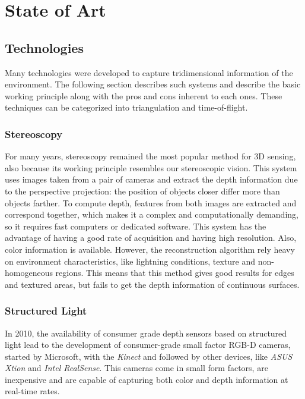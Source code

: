 \chapter{State of Art}

\section{Technologies}

Many technologies were developed to capture tridimensional information of the environment. The following section describes such systems and describe the basic working principle along with the pros and cons inherent to each ones. These techniques can be categorized into triangulation and time-of-flight.

\subsection{Stereoscopy}

For many years, stereoscopy remained the most popular method for 3D sensing, also because its working principle resembles our stereoscopic vision. This system uses images taken from a pair of cameras and extract the depth information due to the perspective projection: the position of objects closer differ more than objects farther. To compute depth, features from both images are extracted and correspond together, which makes it a complex and computationally demanding, so it requires fast computers or dedicated software. This system has the advantage of having a good rate of acquisition and having high resolution. Also, color information is available. However, the reconstruction algorithm rely heavy on environment characteristics, like lightning conditions, texture and non-homogeneous regions\cite{klimentjew2010}. This means that this method gives good results for edges and textured areas, but fails to get the depth information of continuous surfaces.

\subsection{Structured Light}

In 2010, the availability of consumer grade depth sensors based on structured light lead to the development of consumer-grade small factor RGB-D cameras, started by Microsoft, with the \textit{Kinect} and followed by other devices, like \textit{ASUS Xtion} and \textit{Intel RealSense}. This cameras come in small form factors, are inexpensive and are capable of capturing both color and depth information at real-time rates\cite{zollhoefer2018}.

